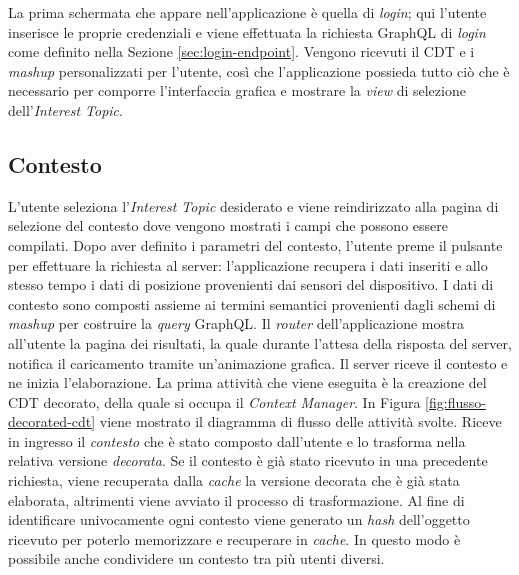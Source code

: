 La prima schermata che appare nell'applicazione è quella di \emph{login}; qui l'utente inserisce le proprie credenziali e viene effettuata la richiesta GraphQL di \emph{login} come definito nella Sezione \ref{sec:login-endpoint}.
Vengono ricevuti il CDT e i \emph{mashup} personalizzati per l'utente, così che l'applicazione possieda tutto ciò che è necessario per comporre l'interfaccia grafica e mostrare la \emph{view} di selezione dell'\emph{Interest Topic}.

\subsection*{Contesto}

L’utente seleziona l’\emph{Interest Topic} desiderato e viene reindirizzato alla pagina di selezione del contesto dove vengono mostrati i campi che possono essere compilati.
Dopo aver definito i parametri del contesto, l’utente preme il pulsante per effettuare la richiesta al server: l’applicazione recupera i dati inseriti e allo stesso tempo i dati di posizione provenienti dai sensori del dispositivo.
I dati di contesto sono composti assieme ai termini semantici provenienti dagli schemi di \emph{mashup} per costruire la \emph{query} GraphQL. Il \emph{router} dell’applicazione mostra all’utente la pagina dei risultati, la quale durante l’attesa della risposta del server, notifica il caricamento tramite un'animazione grafica. Il server riceve il contesto e ne inizia l'elaborazione.
La prima attività che viene eseguita è la creazione del CDT decorato, della quale si occupa il \emph{Context Manager}. In Figura \ref{fig:flusso-decorated-cdt} viene mostrato il diagramma di flusso delle attività svolte. Riceve in ingresso il \emph{contesto} che è stato composto dall'utente e lo trasforma nella relativa versione \emph{decorata}. Se il contesto è già stato ricevuto in una precedente richiesta, viene recuperata dalla \emph{cache} la versione decorata che è già stata elaborata, altrimenti viene avviato il processo di trasformazione. Al fine di identificare univocamente ogni contesto viene generato un \emph{hash} dell'oggetto ricevuto per poterlo memorizzare e recuperare in \emph{cache}. In questo modo è possibile anche condividere un contesto tra più utenti diversi.

